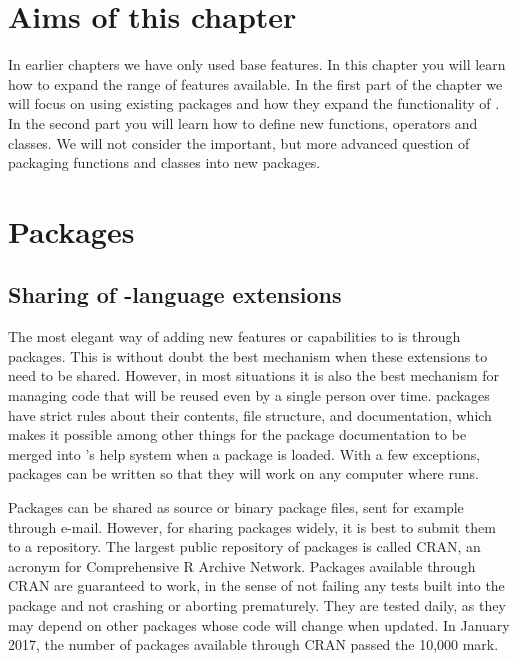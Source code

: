 \documentclass[krantz2]{krantz}\usepackage{knitr}
\begin{document}

\section{Aims of this chapter}

In earlier chapters we have only used base \Rlang features. In this chapter you will learn how to expand the range of features available. In the first part of the chapter we will focus on using existing packages and how they expand the functionality of \Rlang. In the second part you will learn how to define new functions, operators and classes. We will not consider the important, but more advanced question of packaging functions and classes into new \Rlang packages.

\section{Packages}\label{sec:script:packages}

\subsection{Sharing of \Rlang-language extensions}
The most elegant way of adding new features or capabilities to \Rlang is through packages. This is without doubt the best mechanism when these extensions to \Rlang need to be shared. However, in most situations it is also the best mechanism for managing code that will be reused even by a single person over time. \Rlang packages have strict rules about their contents, file structure, and documentation, which makes it possible among other things for the package documentation to be merged into \Rpgrm's help system when a package is loaded. With a few exceptions, packages can be written so that they will work on any computer where \Rpgrm runs.

Packages can be shared as source or binary package files, sent for example through e-mail. However, for sharing packages widely, it is best to submit them to a repository. The largest public repository of \Rpgrm packages is called CRAN, an acronym for Comprehensive R Archive Network. Packages available through CRAN are guaranteed to work, in the sense of not failing any tests built into the package and not crashing or aborting prematurely. They are tested daily, as they may depend on other packages whose code will change when updated. In January 2017, the number of packages available through CRAN passed the 10,000 mark.
\end{document}
